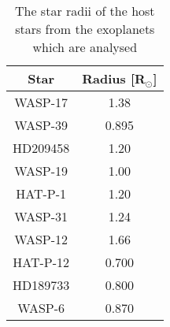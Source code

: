 \begin{table}[!htb]
\centering
\caption{The star radii of the host stars from the exoplanets which are analysed \cite{rsun_source}}
\label{table:host_star_radii}
\begin{tabular}{|c|c|}
\hline
\textbf{Star} & \textbf{Radius} [R$_{\odot}$] \\ \hline
WASP-17       & 1.38                         \\ \hline
WASP-39       & 0.895                        \\ \hline
HD209458      & 1.20                          \\ \hline
WASP-19       & 1.00                        \\ \hline
HAT-P-1       & 1.20                          \\ \hline
WASP-31       & 1.24                         \\ \hline
WASP-12       & 1.66                        \\ \hline
HAT-P-12      & 0.700                          \\ \hline
HD189733      & 0.800                          \\ \hline
WASP-6        & 0.870                         \\ \hline
\end{tabular}
\end{table}




